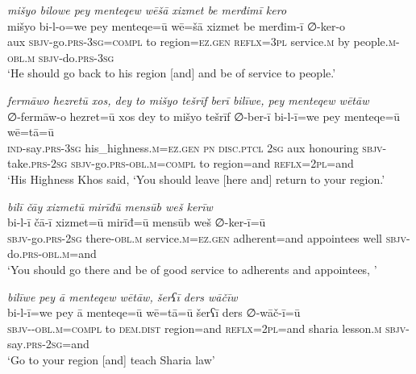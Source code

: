 \ea \label{ŽP.87}
\textit{mišyo bilowe pey menteqew wēšā xizmet be merđimī kero} \\ 
\gll mišyo bi-l-o=we pey menteqe=ū wē=šā xizmet be merđim-ī ∅-ker-o \\ 
 aux \textsc{sbjv-}go\textsc{.prs}\textsc{-3sg}\textsc{=compl} to region\textsc{\textsc{=ez.gen}} \textsc{reflx}\textsc{=3pl} service\textsc{.m} by people\textsc{.m}\textsc{-obl}\textsc{.m} \textsc{sbjv-}do\textsc{.prs}\textsc{-3sg} \\ 
\glt `He should go back to his region [and] and be of service to people.'
\z 
 
\ea \label{ŽP.91}
\textit{fermāwo hezretū xos, dey to mišyo tešrīf berī bilīwe, pey menteqew wētāw} \\ 
\gll ∅-fermāw-o hezret=ū xos dey to mišyo tešrīf ∅-ber-ī bi-l-ī=we pey menteqe=ū wē=tā=ū \\ 
 \textsc{ind-}say\textsc{.prs}\textsc{-3sg} his\_highness\textsc{.m}\textsc{\textsc{=ez.gen}} \textsc{pn} \textsc{disc.ptcl} \textsc{2sg} aux honouring \textsc{sbjv-}take\textsc{.prs}-\textsc{2sg} \textsc{sbjv-}go\textsc{.prs}\textsc{-obl}\textsc{.m}\textsc{=compl} to region=and \textsc{reflx}=\textsc{2pl}=and \\ 
\glt `His Highness Khos said, ‘You should leave [here and] return to your region.'
\z 
 
\ea \label{ŽP.92}
\textit{bilī čāy xizmetū mirīđū mensūb weš kerīw} \\ 
\gll bi-l-ī čā-ī xizmet=ū mirīđ=ū mensūb weš ∅-ker-ī=ū \\ 
 \textsc{sbjv-}go\textsc{.prs}-\textsc{2sg} there\textsc{-obl}\textsc{.m} service\textsc{.m}\textsc{\textsc{=ez.gen}} adherent=and appointees well \textsc{sbjv-}do\textsc{.prs}\textsc{-obl}\textsc{.m}=and \\ 
\glt `You should go there and be of good service to adherents and appointees, '
\z 
 
\ea \label{ŽP.93}
\textit{bilīwe pey ā menteqew wētāw, šerʕī ders wāčīw} \\ 
\gll bi-l-ī=we pey ā menteqe=ū wē=tā=ū šerʕī ders ∅-wāč-ī=ū \\ 
 \textsc{sbjv-}\textsc{-obl}\textsc{.m}\textsc{=compl} to \textsc{dem.dist} region=and \textsc{reflx}=\textsc{2pl}=and sharia lesson\textsc{.m} \textsc{sbjv-}say\textsc{.prs-}\textsc{2sg}=and \\ 
\glt `Go to your region [and] teach Sharia law'
\z 
 
